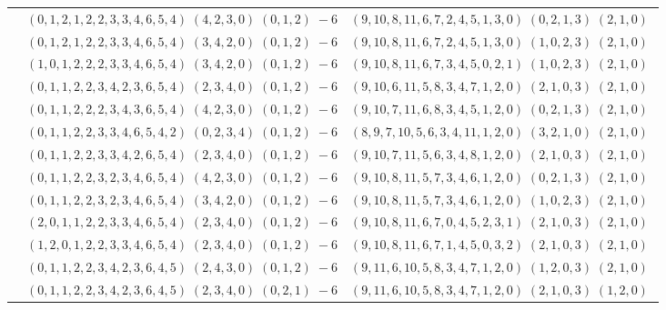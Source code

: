 \documentclass[11pt]{article}
\begin{document}
\begin{longtable}[l]{|c|c|c|}
 \cline{2-3} 
 & $(0 ,1 ,2 ,1 ,2 ,2 ,3 ,3 ,4 ,6 ,5 ,4) \;(4 ,2 ,3 ,0) \;(0 ,1 ,2) \;-6$ & $(9 ,10 ,8 ,11 ,6 ,7 ,2 ,4 ,5 ,1 ,3 ,0) \;(0 ,2 ,1 ,3) \;(2 ,1 ,0) \;$\\ 
 \cline{2-3} 
 & $(0 ,1 ,2 ,1 ,2 ,2 ,3 ,3 ,4 ,6 ,5 ,4) \;(3 ,4 ,2 ,0) \;(0 ,1 ,2) \;-6$ & $(9 ,10 ,8 ,11 ,6 ,7 ,2 ,4 ,5 ,1 ,3 ,0) \;(1 ,0 ,2 ,3) \;(2 ,1 ,0) \;$\\ 
 \cline{2-3} 
 & $(1 ,0 ,1 ,2 ,2 ,2 ,3 ,3 ,4 ,6 ,5 ,4) \;(3 ,4 ,2 ,0) \;(0 ,1 ,2) \;-6$ & $(9 ,10 ,8 ,11 ,6 ,7 ,3 ,4 ,5 ,0 ,2 ,1) \;(1 ,0 ,2 ,3) \;(2 ,1 ,0) \;$\\ 
 \cline{2-3} 
 & $(0 ,1 ,1 ,2 ,2 ,3 ,4 ,2 ,3 ,6 ,5 ,4) \;(2 ,3 ,4 ,0) \;(0 ,1 ,2) \;-6$ & $(9 ,10 ,6 ,11 ,5 ,8 ,3 ,4 ,7 ,1 ,2 ,0) \;(2 ,1 ,0 ,3) \;(2 ,1 ,0) \;$\\ 
 \cline{2-3} 
 & $(0 ,1 ,1 ,2 ,2 ,2 ,3 ,4 ,3 ,6 ,5 ,4) \;(4 ,2 ,3 ,0) \;(0 ,1 ,2) \;-6$ & $(9 ,10 ,7 ,11 ,6 ,8 ,3 ,4 ,5 ,1 ,2 ,0) \;(0 ,2 ,1 ,3) \;(2 ,1 ,0) \;$\\ 
 \cline{2-3} 
 & $(0 ,1 ,1 ,2 ,2 ,3 ,3 ,4 ,6 ,5 ,4 ,2) \;(0 ,2 ,3 ,4) \;(0 ,1 ,2) \;-6$ & $(8 ,9 ,7 ,10 ,5 ,6 ,3 ,4 ,11 ,1 ,2 ,0) \;(3 ,2 ,1 ,0) \;(2 ,1 ,0) \;$\\ 
 \cline{2-3} 
 & $(0 ,1 ,1 ,2 ,2 ,3 ,3 ,4 ,2 ,6 ,5 ,4) \;(2 ,3 ,4 ,0) \;(0 ,1 ,2) \;-6$ & $(9 ,10 ,7 ,11 ,5 ,6 ,3 ,4 ,8 ,1 ,2 ,0) \;(2 ,1 ,0 ,3) \;(2 ,1 ,0) \;$\\ 
 \cline{2-3} 
 & $(0 ,1 ,1 ,2 ,2 ,3 ,2 ,3 ,4 ,6 ,5 ,4) \;(4 ,2 ,3 ,0) \;(0 ,1 ,2) \;-6$ & $(9 ,10 ,8 ,11 ,5 ,7 ,3 ,4 ,6 ,1 ,2 ,0) \;(0 ,2 ,1 ,3) \;(2 ,1 ,0) \;$\\ 
 \cline{2-3} 
 & $(0 ,1 ,1 ,2 ,2 ,3 ,2 ,3 ,4 ,6 ,5 ,4) \;(3 ,4 ,2 ,0) \;(0 ,1 ,2) \;-6$ & $(9 ,10 ,8 ,11 ,5 ,7 ,3 ,4 ,6 ,1 ,2 ,0) \;(1 ,0 ,2 ,3) \;(2 ,1 ,0) \;$\\ 
 \cline{2-3} 
 & $(2 ,0 ,1 ,1 ,2 ,2 ,3 ,3 ,4 ,6 ,5 ,4) \;(2 ,3 ,4 ,0) \;(0 ,1 ,2) \;-6$ & $(9 ,10 ,8 ,11 ,6 ,7 ,0 ,4 ,5 ,2 ,3 ,1) \;(2 ,1 ,0 ,3) \;(2 ,1 ,0) \;$\\ 
 \cline{2-3} 
 & $(1 ,2 ,0 ,1 ,2 ,2 ,3 ,3 ,4 ,6 ,5 ,4) \;(2 ,3 ,4 ,0) \;(0 ,1 ,2) \;-6$ & $(9 ,10 ,8 ,11 ,6 ,7 ,1 ,4 ,5 ,0 ,3 ,2) \;(2 ,1 ,0 ,3) \;(2 ,1 ,0) \;$\\ 
 \cline{2-3} 
 & $(0 ,1 ,1 ,2 ,2 ,3 ,4 ,2 ,3 ,6 ,4 ,5) \;(2 ,4 ,3 ,0) \;(0 ,1 ,2) \;-6$ & $(9 ,11 ,6 ,10 ,5 ,8 ,3 ,4 ,7 ,1 ,2 ,0) \;(1 ,2 ,0 ,3) \;(2 ,1 ,0) \;$\\ 
 \cline{2-3} 
 & $(0 ,1 ,1 ,2 ,2 ,3 ,4 ,2 ,3 ,6 ,4 ,5) \;(2 ,3 ,4 ,0) \;(0 ,2 ,1) \;-6$ & $(9 ,11 ,6 ,10 ,5 ,8 ,3 ,4 ,7 ,1 ,2 ,0) \;(2 ,1 ,0 ,3) \;(1 ,2 ,0) \;$\\ 

\end{longtable}
\end{document}
